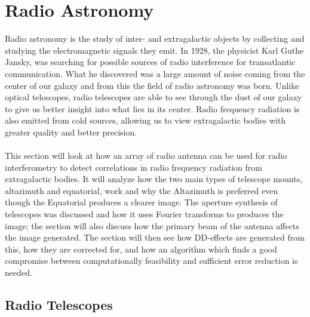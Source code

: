 \section{Radio Astronomy}\label{ra}
Radio astronomy is the study of inter- and extragalactic objects by collecting and studying the electromagnetic signals they emit. In 1928, the physicist Karl Guthe Jansky, was searching for possible sources of radio interference for transatlantic communication. What he discovered was a large amount of noise coming from the center of our galaxy and from this the field of radio astronomy was born. Unlike optical telescopes, radio telescopes are able to see through the dust of our galaxy to give us better insight into what lies in its center. Radio frequency radiation is also emitted from cold sources, allowing us to view extragalactic bodies with greater quality and better precision\citep{radio_intro}.
\\
\\
This section will look at how an array of radio antenna can be used for radio interferometry to detect correlations in radio frequency radiation from extragalactic bodies. It will analyze how the two main types of telescope mounts, altazimuth and equatorial, work and why the Altazimuth is preferred even though the Equatorial produces a clearer image. The aperture synthesis of telescopes was discussed and how it uses Fourier transforms to produces the image; the section will also discuss how the primary beam of the antenna affects the image generated. The section will then see how DD-effects are generated from this, how they are corrected for, and how an algorithm which finds a good compromise between computationally feasibility and sufficient error reduction is needed.
\subsection{Radio Telescopes}\label{ra:sec:rt}
%
